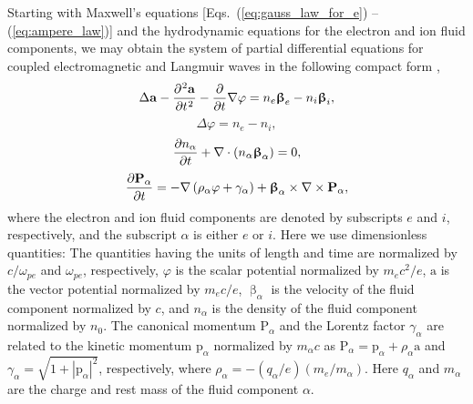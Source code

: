 \documentclass[10pt, a4paper, twoside, openright]{report}
\newcommand{\norm}[1]{|#1|}
\renewcommand{\vec}[1]{\boldsymbol{\mathrm{#1}}}
\newcommand{\rot}[1]{\nabla \times #1}
\newcommand{\grad}[1]{\nabla #1}
\renewcommand{\div}[1]{\nabla \cdot #1}
\newcommand{\laplace}[1]{\Delta #1}
\begin{document}
Starting with Maxwell's equations [Eqs.~(\ref{eq:gauss_law_for_e}) -- (\ref{eq:ampere_law})] and the hydrodynamic equations for the electron and ion fluid components, we may obtain the system of partial differential equations for coupled electromagnetic and Langmuir waves in the following compact form \cite{Farina2001, Bulanov2013, Bulanov2021},
\begin{equation}\label{eq:eq_for_vector_potential}
\laplace{\vec{a}} - \diffp[2]{\vec{a}}{t} - \diffp{}{t} \grad{\varphi} = n_e \vec{\upbeta}_e - n_i \vec{\upbeta}_i,
\end{equation}
\begin{equation}\label{eq:eq_for_scalar_potential}
\laplace{\varphi} = n_e - n_i,
\end{equation}
\begin{equation}\label{eq:eq_for_density}
\diffp{n_{\alpha}}{t} +  \div{ \left( n_{\alpha} \vec{\upbeta}_{\alpha} \right) } = 0,
\end{equation}
\begin{equation}\label{eq:eq_for_momentum}
\diffp{\vec{P}_{\alpha}}{t} = - \grad{\left( \rho_{\alpha} \varphi + \gamma_{\alpha} \right)} + \vec{\upbeta}_{\alpha} \times \rot{\vec{P}_{\alpha}},
\end{equation}
where the electron and ion fluid components are denoted by subscripts $ e $ and $ i $, respectively, and the subscript $ \alpha $ is either $ e $ or $ i $. Here we use dimensionless quantities: The quantities having the units of length and time are normalized by $ c / \omega_{pe} $ and $ \omega_{pe} $, respectively, $ \varphi $ is the scalar potential normalized by $ m_e c^2 / e $, $ \vec{a} $ is the vector potential normalized by $ m_e c / e $, $ \vec{\upbeta}_{\alpha} $ is the velocity of the fluid component normalized by $ c $, and $ n_{\alpha} $ is the density of the fluid component normalized by $ n_0 $. The canonical momentum $ \vec{P}_{\alpha} $ and the Lorentz factor $ \gamma_{\alpha} $ are related to the kinetic momentum $ \vec{p}_{\alpha} $ normalized by $ m_{\alpha} c $ as $ \vec{P}_{\alpha} = \vec{p}_{\alpha} + \rho_{\alpha} \vec{a} $ and $ \gamma_{\alpha} = \sqrt{1 + \norm{\vec{p}_{\alpha}}^2} $, respectively, where $ \rho_{\alpha} = - \left( q_{\alpha} / e \right) \left( m_e / m_{\alpha} \right) $. Here $ q_{\alpha} $ and $ m_{\alpha} $ are the charge and rest mass of the fluid component $ \alpha $. 
\end{document}
